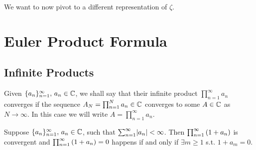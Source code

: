 \setcounter{section}{0}
\setcounter{theorem}{0}


We want to now pivot to a different representation of $\zeta$.

\section{Euler Product Formula}

\subsection{Infinite Products}
Given $\{ a_n \}_{n=1}^\infty, \, a_n \in \mathbb{C}$, we shall say that their infinite product $\prod_{n=1}^\infty a_n$ converges if the sequence $A_N = \prod_{n=1}^N a_n \in \mathbb{C}$ converges to some $A\in \mathbb{C}$ as $N \to \infty$. In this case we will write $A= \prod_{n=1}^\infty a_n$.

\begin{lemma}\label{lem:inf-prod-lemma}
Suppose $\{ a_n \}_{n=1}^\infty, \, a_n \in \mathbb{C}$, such that $\sum_{n=1}^\infty \abs{a_n} < \infty$. Then $\prod_{n=1}^\infty \left( 1+a_n \right)$ is convergent and $\prod_{n=1}^\infty \left( 1+a_n \right) = 0$ happens if and only if $\exists m \geq 1 $ s.t. $1+a_m = 0$.
\end{lemma}


